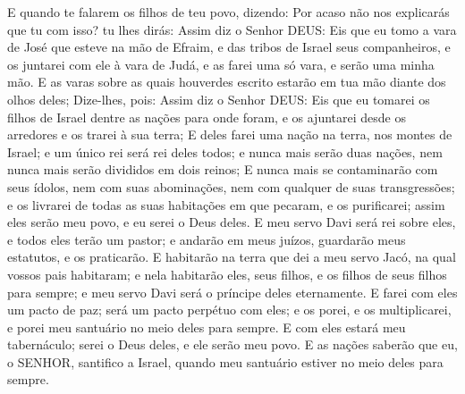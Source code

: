 {E quando te falarem os filhos de teu povo, dizendo: Por acaso não nos explicarás que tu
{} com isso?
 tu lhes dirás: Assim diz o Senhor DEUS: Eis que eu tomo a vara de José que esteve na mão de Efraim, e das tribos de Israel seus companheiros, e os juntarei com ele à vara de Judá, e as farei uma só vara, e serão uma minha mão.
E as varas sobre as quais houverdes escrito estarão em tua mão diante dos olhos deles;
Dize-lhes, pois: Assim diz o Senhor DEUS: Eis que eu tomarei os filhos de Israel dentre as nações para onde foram, e os ajuntarei desde os arredores e os trarei à sua
{} terra;
E deles farei uma nação na terra, nos montes de Israel; e um único rei será rei deles todos; e nunca mais serão duas nações, nem nunca mais serão divididos em dois reinos;
E nunca mais se contaminarão com seus ídolos, nem com suas abominações, nem com qualquer de suas transgressões; e os livrarei de todas as suas habitações em que pecaram, e os purificarei; assim eles serão meu povo, e eu serei o Deus deles.
E meu servo Davi será rei sobre eles, e todos eles terão um
{} pastor; e andarão em meus juízos, guardarão meus estatutos, e os praticarão.
E habitarão na terra que dei a meu servo Jacó, na qual vossos pais habitaram; e nela habitarão eles, seus filhos, e os filhos de seus filhos para sempre; e meu servo Davi será o príncipe deles eternamente.
E farei com eles um pacto de paz; será um pacto perpétuo com eles; e os porei, e os multiplicarei, e porei meu santuário no meio deles para sempre.
E com eles estará meu tabernáculo; serei o Deus deles, e ele serão meu povo.
E as nações saberão que eu, o SENHOR, santifico a Israel, quando meu santuário estiver no meio deles para sempre.

}
